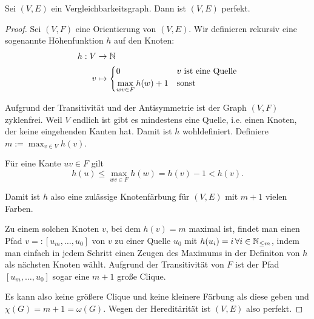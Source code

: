 \documentclass[../main.tex]{subfiles}
\begin{document}
\begin{satz}
    Sei $(V, E)$ ein Vergleichbarkeitsgraph. Dann ist $(V, E)$ perfekt.
\end{satz}
\begin{proof}
    Sei $(V, F)$ eine Orientierung von $(V, E)$. Wir definieren rekursiv eine sogenannte Höhenfunktion $h$ auf den Knoten:
    \begin{align*}
        h : V &\to \mathbb{N} \\
        v &\mapsto \begin{cases}
            0 &v \text{ ist eine Quelle}\\
            \max\limits_{wv \in F} h(w) + 1 &\text {sonst}
        \end{cases}
    \end{align*}
    
    Aufgrund der Transitivität und der Antisymmetrie ist der Graph $(V, F)$ zyklenfrei. Weil $V$ endlich ist gibt es mindestens eine Quelle, i.e. einen Knoten, der keine eingehenden Kanten hat. Damit ist $h$ wohldefiniert. Definiere $m := \max_{v \in V} h(v)$.

    Für eine Kante $uv \in F$ gilt
    $$h(u) \leq \max\limits_{wv \in F} h(w) = h(v) - 1 < h(v).$$

    Damit ist $h$ also eine zulässige Knotenfärbung für $(V, E)$ mit $m + 1$ vielen Farben.
    
    Zu einem solchen Knoten $v$, bei dem $h(v) = m$ maximal ist, findet man einen Pfad $v =: [u_m, \hdots, u_0]$ von $v$ zu einer Quelle $u_0$ mit $h(u_i) = i\, \forall i \in \mathbb{N}_{\leq m}$, indem man einfach in jedem Schritt einen Zeugen des Maximums in der Definiton von $h$ als nächsten Knoten wählt. Aufgrund der Transitivität von $F$ ist der Pfad $[u_m, \hdots, u_0]$ sogar eine $m+1$ große Clique.
    
    Es kann also keine größere Clique und keine kleinere Färbung als diese geben und $\chi(G) = m+1 = \omega(G)$. Wegen der Hereditärität ist $(V, E)$ also perfekt.
\end{proof}
\end{document}
